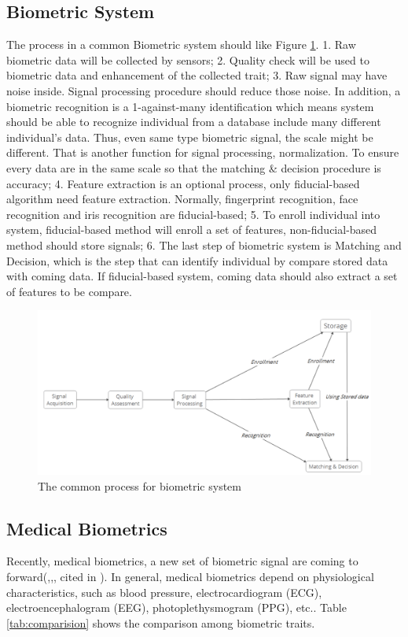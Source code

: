 \documentclass[a4paper,12pt]{article}
\begin{document}
\subsection{Biometric System}
The process in a common Biometric system should like Figure \ref{fig:common_process}. 1. Raw biometric data will be collected by sensors; 2. Quality check will be used to biometric data and enhancement of the collected trait\parencite{Pinto:2018evolution}; 3. Raw signal may have noise inside. Signal processing procedure should reduce those noise. In addition, a biometric recognition is a 1-against-many identification which means system should be able to recognize individual from a database include many different individual's data. Thus, even same type biometric signal, the scale might be different. That is another function for signal processing, normalization. To ensure every data are in the same scale so that the matching \& decision procedure is accuracy; 4. Feature extraction is an optional process, only fiducial-based algorithm need feature extraction. Normally, fingerprint recognition, face recognition and iris recognition are fiducial-based\parencite{Jain:2011bio}; 5. To enroll individual into system, fiducial-based method will enroll a set of features, non-fiducial-based method should store signals; 6. The last step of biometric system is Matching and Decision, which is the step that can identify individual by compare stored data with coming data. If fiducial-based system, coming data should also extract a set of features to be compare.

\begin{figure}[htbp]
\centering
\includegraphics[width = .8\textwidth]{common_bio_process.png}
\caption{The common process for biometric system}
\label{fig:common_process}
\end{figure}

\subsection{Medical Biometrics}
Recently, medical biometrics, a new set of biometric signal are coming to forward(\parencite{Abo:2014biometric},\parencite{Agrafioti:2012secure},\parencite{Akhter:2016heart}, cited in \parencite{Pinto:2018evolution}). In general, medical biometrics depend on physiological characteristics, such as blood pressure, electrocardiogram (ECG), electroencephalogram (EEG), photoplethysmogram (PPG), etc.\parencite{Agrafioti:2011medical}. Table \ref{tab:comparision} shows the comparison among biometric traits.
\end{document}
